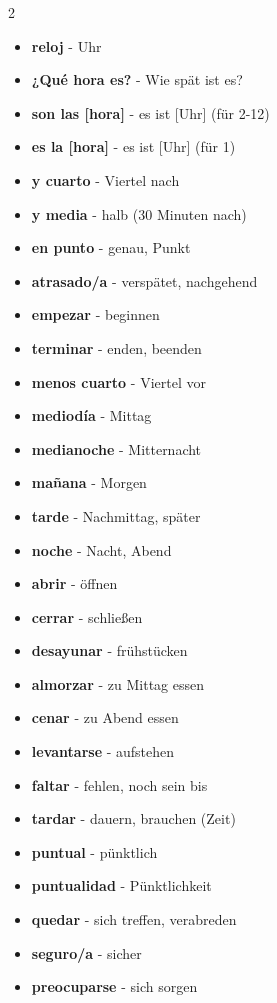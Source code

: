 \documentclass[12pt,a4paper]{article}
\begin{document}
\begin{multicols}{2}
\begin{itemize}[leftmargin=*]
    \item \textbf{reloj} - Uhr
    \item \textbf{¿Qué hora es?} - Wie spät ist es?
    \item \textbf{son las [hora]} - es ist [Uhr] (für 2-12)
    \item \textbf{es la [hora]} - es ist [Uhr] (für 1)
    \item \textbf{y cuarto} - Viertel nach
    \item \textbf{y media} - halb (30 Minuten nach)
    \item \textbf{en punto} - genau, Punkt
    \item \textbf{atrasado/a} - verspätet, nachgehend
    \item \textbf{empezar} - beginnen
    \item \textbf{terminar} - enden, beenden
    \item \textbf{menos cuarto} - Viertel vor
    \item \textbf{mediodía} - Mittag
    \item \textbf{medianoche} - Mitternacht
    \item \textbf{mañana} - Morgen
    \item \textbf{tarde} - Nachmittag, später
    \item \textbf{noche} - Nacht, Abend
    \item \textbf{abrir} - öffnen
    \item \textbf{cerrar} - schließen
    \item \textbf{desayunar} - frühstücken
    \item \textbf{almorzar} - zu Mittag essen
    \item \textbf{cenar} - zu Abend essen
    \item \textbf{levantarse} - aufstehen
    \item \textbf{faltar} - fehlen, noch sein bis
    \item \textbf{tardar} - dauern, brauchen (Zeit)
    \item \textbf{puntual} - pünktlich
    \item \textbf{puntualidad} - Pünktlichkeit
    \item \textbf{quedar} - sich treffen, verabreden
    \item \textbf{seguro/a} - sicher
    \item \textbf{preocuparse} - sich sorgen
\end{itemize}
\end{multicols}
\end{document}
